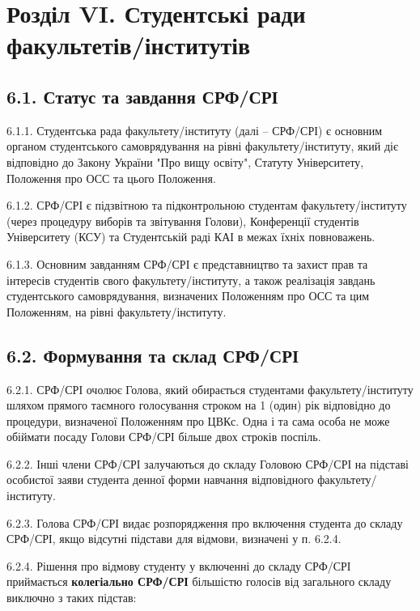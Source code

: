 \section*{Розділ VI. Студентські ради факультетів/інститутів}

\subsection*{6.1. Статус та завдання СРФ/СРІ}
    6.1.1. Студентська рада факультету/інституту (далі – СРФ/СРІ) є основним органом студентського самоврядування на рівні факультету/інституту, який діє відповідно до Закону України "Про вищу освіту", Статуту Університету, Положення про ОСС та цього Положення.

    6.1.2. СРФ/СРІ є підзвітною та підконтрольною студентам факультету/інституту (через процедуру виборів та звітування Голови), Конференції студентів Університету (КСУ) та Студентській раді КАІ в межах їхніх повноважень.

    6.1.3. Основним завданням СРФ/СРІ є представництво та захист прав та інтересів студентів свого факультету/інституту, а також реалізація завдань студентського самоврядування, визначених Положенням про ОСС та цим Положенням, на рівні факультету/інституту.

\subsection*{6.2. Формування та склад СРФ/СРІ}
    6.2.1. СРФ/СРІ очолює Голова, який обирається студентами факультету/інституту шляхом прямого таємного голосування строком на 1 (один) рік відповідно до процедури, визначеної Положенням про ЦВКс. Одна і та сама особа не може обіймати посаду Голови СРФ/СРІ більше двох строків поспіль.

    6.2.2. Інші члени СРФ/СРІ залучаються до складу Головою СРФ/СРІ на підставі особистої заяви студента денної форми навчання відповідного факультету/інституту.

    6.2.3. Голова СРФ/СРІ видає розпорядження про включення студента до складу СРФ/СРІ, якщо відсутні підстави для відмови, визначені у п. 6.2.4.

    6.2.4. Рішення про відмову студенту у включенні до складу СРФ/СРІ приймається \textbf{колегіально СРФ/СРІ} більшістю голосів від загального складу виключно з таких підстав:


